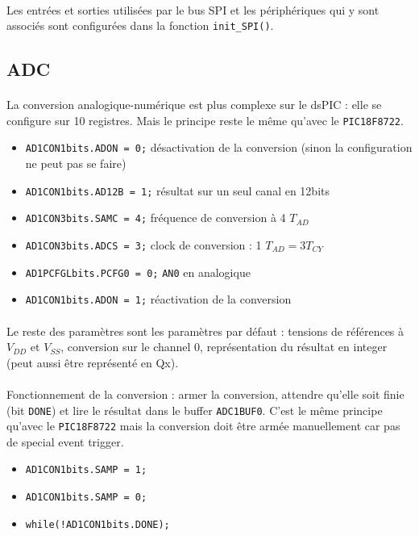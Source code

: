 \documentclass{article}
\begin{document}
        \paragraph{}
        Les entrées et sorties utilisées par le bus SPI et les périphériques qui y sont associés sont configurées dans la fonction \texttt{init\_SPI()}.


        \subsection{ADC}
        \paragraph{}
        La conversion analogique-numérique est plus complexe sur le dsPIC : elle se configure sur 10 registres. Mais le principe reste le même qu'avec le \texttt{PIC18F8722}.
        \begin{itemize}
            \item \texttt{AD1CON1bits.ADON = 0;} désactivation de la conversion (sinon la configuration ne peut pas se faire)
            \item \texttt{AD1CON1bits.AD12B = 1;} résultat sur un seul canal en 12bits
            \item \texttt{AD1CON3bits.SAMC = 4;} fréquence de conversion à 4 $T_{AD}$
            \item \texttt{AD1CON3bits.ADCS = 3;} clock de conversion : 1 $T_{AD} = 3 T_{CY}$
            \item \texttt{AD1PCFGLbits.PCFG0 = 0;} \texttt{AN0} en analogique
            \item \texttt{AD1CON1bits.ADON = 1;} réactivation de la conversion
        \end{itemize}

        \paragraph{}
        Le reste des paramètres sont les paramètres par défaut : tensions de références à $V_{DD}$ et $V_{SS}$, conversion sur le channel 0, représentation du résultat en integer (peut aussi être représenté en Qx).

        \paragraph{}
        Fonctionnement de la conversion : armer la conversion, attendre qu'elle soit finie (bit \texttt{DONE}) et lire le résultat dans le buffer \texttt{ADC1BUF0}. C'est le même principe qu'avec le \texttt{PIC18F8722} mais la conversion doit être armée manuellement car pas de special event trigger.
        \begin{itemize}
            \item \texttt{AD1CON1bits.SAMP = 1;}
            \item \texttt{AD1CON1bits.SAMP = 0;}
            \item \texttt{while(!AD1CON1bits.DONE);}
        \end{itemize}
\end{document}
